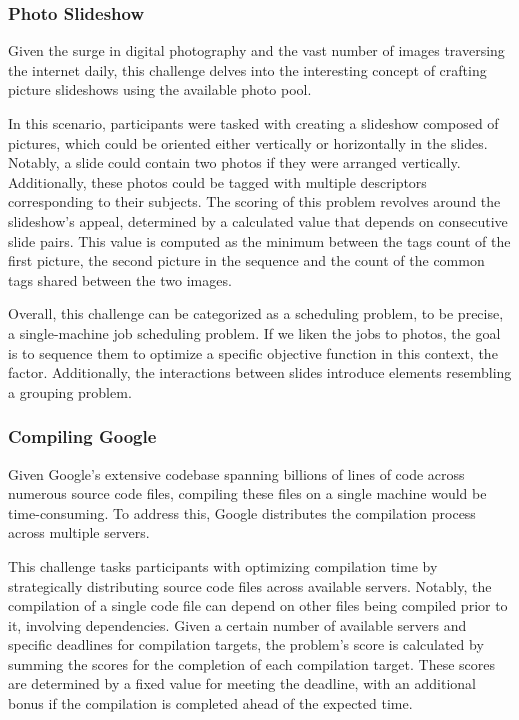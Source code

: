 \subsubsection*{Photo Slideshow}
\label{subsubsec:hashcode-2019-qualification}

Given the surge in digital photography and the vast number of images traversing
the internet daily, this challenge delves into the interesting concept of crafting
picture slideshows using the available photo pool.

In this scenario, participants were tasked with creating a slideshow composed of
pictures, which could be oriented either vertically or horizontally in the
slides. Notably, a slide could contain two photos if they were arranged
vertically. Additionally, these photos could be tagged with multiple descriptors
corresponding to their subjects. The scoring of this problem revolves around the
slideshow's appeal, determined by a calculated value that depends on consecutive
slide pairs. This value is computed as the minimum between the tags count of the
first picture, the second picture in the sequence and the count of the common
tags shared between the two images.

Overall, this challenge can be categorized as a scheduling problem, to be
precise, a single-machine job scheduling problem. If we liken the jobs to
photos, the goal is to sequence them to optimize a specific objective function
in this context, the~ factor. Additionally, the interactions
between slides introduce elements resembling a grouping problem.

\subsubsection*{Compiling Google}
\label{subsubsec:hashcode-2019-final}

Given Google's extensive codebase spanning billions of lines of code across
numerous source code files, compiling these files on a single machine would be
time-consuming. To address this, Google distributes the compilation process
across multiple servers.

This challenge tasks participants with optimizing compilation time by
strategically distributing source code files across available servers. Notably,
the compilation of a single code file can depend on other files being compiled
prior to it, involving dependencies. Given a certain number of available servers
and specific deadlines for compilation targets, the problem's score is
calculated by summing the scores for the completion of each compilation target.
These scores are determined by a fixed value for meeting the deadline, with an
additional bonus if the compilation is completed ahead of the expected time.

